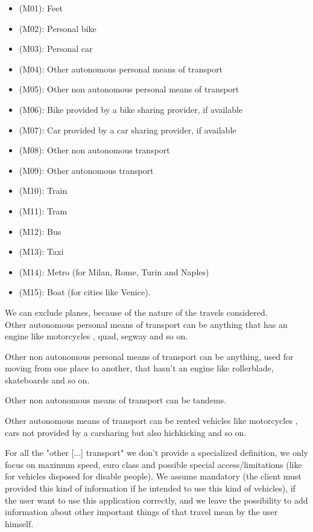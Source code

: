 \documentclass[a4paper,leqno]{book}
\begin{document}
\begin{itemize}

\item (M01): Feet 
\item (M02): Personal bike 
\item (M03): Personal car
\item (M04): Other autonomous personal means of transport
\item (M05): Other non autonomous personal means of transport
\item (M06): Bike provided by a bike sharing provider, if available
\item (M07): Car provided by a car sharing provider, if available
\item (M08): Other non autonomous transport
\item (M09): Other autonomous transport
\item (M10): Train
\item (M11): Tram
\item (M12): Bus 
\item (M13): Taxi
\item (M14): Metro (for Milan, Rome, Turin and Naples)
\item (M15): Boat (for cities like Venice).

\end{itemize}

We can exclude planes, because of the nature of the travels considered.\\

Other autonomous personal means of transport can be anything that has an engine like motorcycles , quad, segway and so on.

Other non autonomous personal means of transport can be anything, used for moving from one place to another, that hasn't an engine like rollerblade, skateboards and so on.

Other non autonomous means of transport can be tandems. 

Other autonomous means of transport can be rented vehicles like motorcycles , cars not provided by a carsharing but also hichkicking and so on.

For all the "other [...] transport" we don't provide a specialized definition, we only focus on maximum speed, euro class and possible special access/limitations (like for vehicles disposed for disable people). We assume mandatory (the client must provided this kind of information if he intended to use this kind of vehicles), if the user want to use this application correctly, and we leave the possibility to add information about other important things of that travel mean by the user himself.
\end{document}
